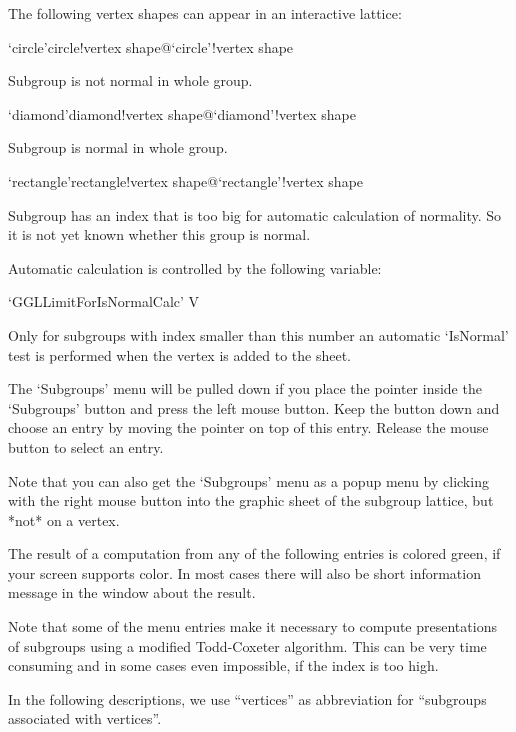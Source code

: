 
The following vertex shapes can appear in an interactive lattice:

\>`circle'{circle!vertex shape}@{`circle'!vertex shape}

  Subgroup is not normal in whole group.

\>`diamond'{diamond!vertex shape}@{`diamond'!vertex shape}

  Subgroup is normal in whole group.

\>`rectangle'{rectangle!vertex shape}@{`rectangle'!vertex shape}

  Subgroup has an index that is too big for automatic calculation of
  normality. So it is not yet known whether this group is normal.

\bigskip%

Automatic calculation is controlled by the following variable:

\>`GGLLimitForIsNormalCalc' V

  Only for subgroups with index smaller than this number an automatic
  `IsNormal' test is performed when the vertex is added to the sheet.



The `Subgroups' menu will be pulled down  if you place the pointer inside
the `Subgroups' button and press the  left mouse button.  Keep the button
down and  choose an entry by  moving  the pointer on   top of this entry.
Release the mouse button to select an entry.

Note that you can also get the `Subgroups' menu as a popup menu by
clicking with the right mouse button into the graphic sheet of the subgroup
lattice, but *not* on a vertex.

The result of  a computation  from any  of  the following entries  is
colored green, if  your screen supports color.   In most cases there will
also be short information message in the {\GAP} window about the result.

Note that  some of   the menu entries  make  it  necessary  to compute
presentations of subgroups   using a modified Todd-Coxeter  algorithm. 
This can be very time consuming and  in some cases even impossible, if
the index is too high.

In  the following descriptions, we  use ``vertices'' as abbreviation for
``subgroups associated with vertices''.

